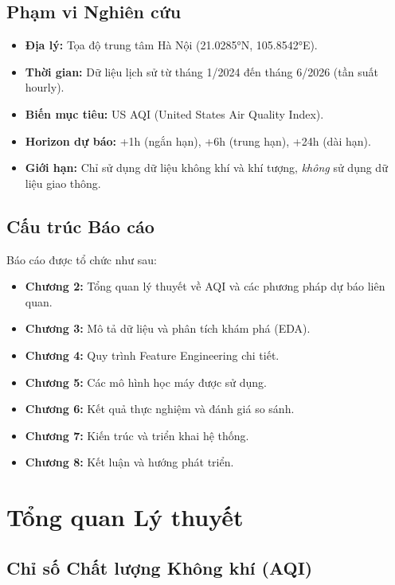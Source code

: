 \documentclass[12pt,a4paper]{report}
\begin{document}
\section{Phạm vi Nghiên cứu}

\begin{itemize}
  \item \textbf{Địa lý:} Tọa độ trung tâm Hà Nội (21.0285°N, 105.8542°E).
  \item \textbf{Thời gian:} Dữ liệu lịch sử từ tháng 1/2024 đến tháng 6/2026 (tần suất hourly).
  \item \textbf{Biến mục tiêu:} US AQI (United States Air Quality Index).
  \item \textbf{Horizon dự báo:} +1h (ngắn hạn), +6h (trung hạn), +24h (dài hạn).
  \item \textbf{Giới hạn:} Chỉ sử dụng dữ liệu không khí và khí tượng, \textit{không} sử dụng dữ liệu giao thông.
\end{itemize}

\section{Cấu trúc Báo cáo}

Báo cáo được tổ chức như sau:
\begin{itemize}
  \item \textbf{Chương 2:} Tổng quan lý thuyết về AQI và các phương pháp dự báo liên quan.
  \item \textbf{Chương 3:} Mô tả dữ liệu và phân tích khám phá (EDA).
  \item \textbf{Chương 4:} Quy trình Feature Engineering chi tiết.
  \item \textbf{Chương 5:} Các mô hình học máy được sử dụng.
  \item \textbf{Chương 6:} Kết quả thực nghiệm và đánh giá so sánh.
  \item \textbf{Chương 7:} Kiến trúc và triển khai hệ thống.
  \item \textbf{Chương 8:} Kết luận và hướng phát triển.
\end{itemize}

\chapter{Tổng quan Lý thuyết}

\section{Chỉ số Chất lượng Không khí (AQI)}
\end{document}
